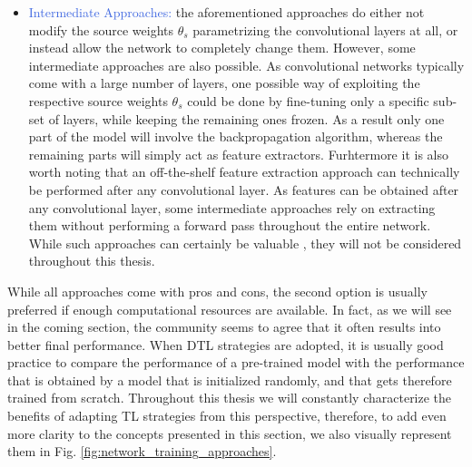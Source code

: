 \begin{itemize}
	\item \textcolor{RoyalBlue}{Intermediate Approaches:} the aforementioned approaches do either not modify the source weights $\theta_s$ parametrizing the convolutional layers at all, or instead allow the network to completely change them. However, some intermediate approaches are also possible. As convolutional networks typically come with a large number of layers, one possible way of exploiting the respective source weights $\theta_s$ could be done by fine-tuning only a specific sub-set of layers, while keeping the remaining ones frozen. As a result only one part of the model will involve the backpropagation algorithm, whereas the remaining parts will simply act as feature extractors. Furhtermore it is also worth noting that an off-the-shelf feature extraction approach can technically be performed after any convolutional layer. As features can be obtained after any convolutional layer, some intermediate approaches rely on extracting them without performing a forward pass throughout the entire network. While such approaches can certainly be valuable \cite{mormont2018comparison,sasso2021fractional}, they will not be considered throughout this thesis. 


\end{itemize}

While all approaches come with pros and cons, the second option is usually preferred if enough computational resources are available. In fact, as we will see in the coming section, the community seems to agree that it often results into better final performance. When DTL strategies are adopted, it is usually good practice to compare the performance of a pre-trained model with the performance that is obtained by a model that is initialized randomly, and that gets therefore trained from scratch. Throughout this thesis we will constantly characterize the benefits of adapting TL strategies from this perspective, therefore, to add even more clarity to the concepts presented in this section, we also visually represent them in Fig. \ref{fig:network_training_approaches}. 

